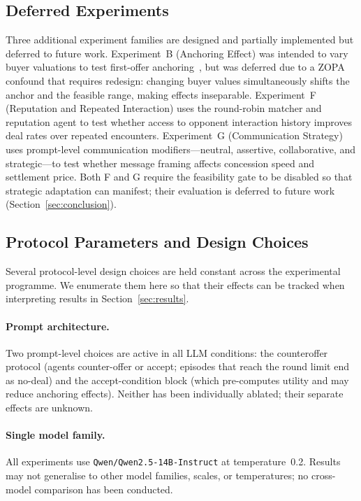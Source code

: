 \subsection{Deferred Experiments}
\label{sec:deferred}

Three additional experiment families are designed and partially implemented but deferred to future work.  Experiment~B (Anchoring Effect) was intended to vary buyer valuations to test first-offer anchoring~\cite{galinsky2001}, but was deferred due to a ZOPA confound that requires redesign: changing buyer values simultaneously shifts the anchor and the feasible range, making effects inseparable.  Experiment~F (Reputation and Repeated Interaction) uses the round-robin matcher and reputation agent to test whether access to opponent interaction history improves deal rates over repeated encounters.  Experiment~G (Communication Strategy) uses prompt-level communication modifiers---neutral, assertive, collaborative, and strategic---to test whether message framing affects concession speed and settlement price.  Both F and G require the feasibility gate to be disabled so that strategic adaptation can manifest; their evaluation is deferred to future work (Section~\ref{sec:conclusion}).


\subsection{Protocol Parameters and Design Choices}
\label{sec:confounds}

Several protocol-level design choices are held constant across the experimental programme.  We enumerate them here so that their effects can be tracked when interpreting results in Section~\ref{sec:results}.

\paragraph{Prompt architecture.}
Two prompt-level choices are active in all LLM conditions: the counteroffer protocol (agents counter-offer or accept; episodes that reach the round limit end as no-deal) and the accept-condition block (which pre-computes utility and may reduce anchoring effects).  Neither has been individually ablated; their separate effects are unknown.

\paragraph{Single model family.}
All experiments use \texttt{Qwen/Qwen2.5-14B-Instruct} at temperature~0.2.  Results may not generalise to other model families, scales, or temperatures; no cross-model comparison has been conducted.

